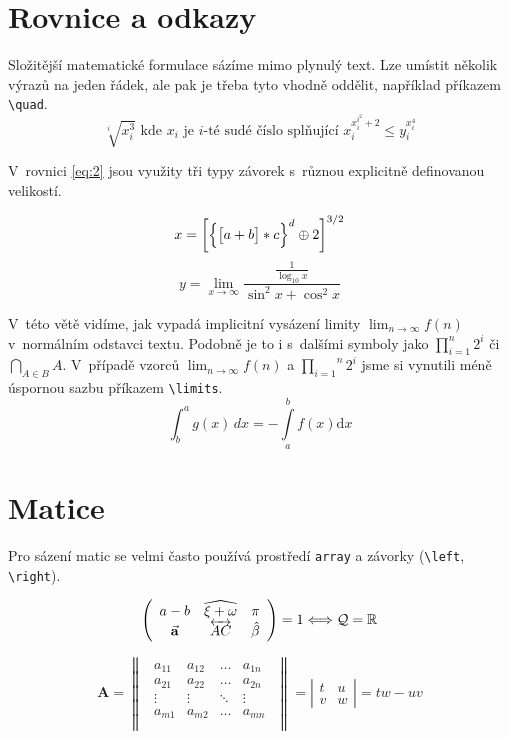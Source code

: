 \documentclass[a4paper, 11pt, twocolumn]{article}
\theoremstyle{definition}
\begin{document}
\section{Rovnice a odkazy}
Složitější matematické formulace sázíme mimo plynulý
text. Lze umístit několik výrazů na jeden řádek, ale pak je
třeba tyto vhodně oddělit, například příkazem \verb!\quad!.
$$\sqrt[i]{x_i^3}\textrm{ kde } x_i \text{ je } i\text{-té sudé číslo splňující } x_i^{x_i^{i^2} +2} \leq y_i^{x_i^4}$$\par
V~rovnici \eqref{eq:2} jsou využity tři typy závorek s~různou
explicitně definovanou velikostí.

\begin{equation} \label{eq:2}
x=\bigg[\Big{\{} \big[a+b \big]\ast c \Big{\}} ^d \oplus 2 \bigg]^{3/2}
\end{equation}
\begin{equation*}
y = \lim_{x\to\infty} \frac{\frac{1}{\log_{10} x}}{\sin^2{x} + \cos^2{x}}
\end{equation*}

V~této větě vidíme, jak vypadá implicitní vysázení limity $\lim_{n\to\infty} f(n)$ v~normálním odstavci textu. Podobně
je to i s~dalšími symboly jako $\prod_{i=1}^n 2^i$
či $\bigcap_{A \in B} A$. V~případě vzorců ${\displaystyle\lim_{n\to\infty} f(n)}$
a
$\overset{n}{\underset{i=1}\prod} 2^i$
jsme si vynutili méně
úspornou sazbu příkazem \verb!\limits!.
$ $
\begin{equation}
\int_{b}^{a} g(x)\,dx = - \int\limits_a^b f(x)\mathrm{d}x  
\end{equation}

\section{Matice}
Pro sázení matic se velmi často používá prostředí \verb!array!
a závorky (\verb!\left!, \verb!\right!).

\begin{equation*}
\left ( {\begin{array}{ccc}
a-b & \widehat{\xi + \omega} & \pi\\
\vec {\rm\bf a} & \overleftrightarrow{AC} & \hat{\beta}
\end{array} } \right )
=
1 \Longleftrightarrow \mathcal{Q} = \mathbb{R}
\end{equation*}

\begin{equation*}
\textbf{A} =
\begin{Vmatrix} 
{\begin{array}{cccc}
a_{11} & a_{12} & \dots & a_{1n}\\
a_{21} & a_{22} & \dots & a_{2n}\\
\vdots & \vdots & \ddots & \vdots\\
a_{m1} & a_{m2} & \dots & a_{mn}\\
\end{array} } 
\end{Vmatrix}
=
\left | {\begin{array}{cc}
t & u\\
v & w
\end{array} } \right |
= tw-uv
\end{equation*}
\end{document}
